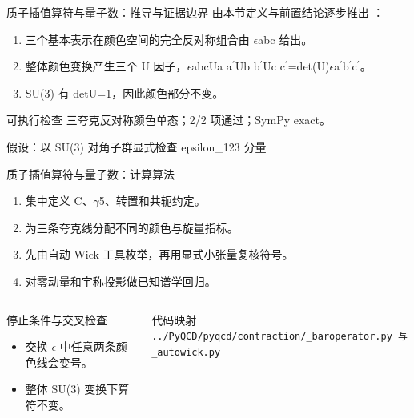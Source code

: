 \begin{frame}[t]{质子插值算符与量子数：推导与证据边界}
\footnotesize
{}\quad 由本节定义与前置结论逐步推出 ：
\begin{enumerate}
\item 三个基本表示在颜色空间的完全反对称组合由 \ensuremath{\epsilon}abc 给出。
\item 整体颜色变换产生三个 U 因子，\ensuremath{\epsilon}abcUa a\ensuremath{^{\prime}}Ub b\ensuremath{^{\prime}}Uc c\ensuremath{^{\prime}}=det(U)\ensuremath{\epsilon}a\ensuremath{^{\prime}}b\ensuremath{^{\prime}}c\ensuremath{^{\prime}}。
\item SU(3) 有 detU=1，因此颜色部分不变。
\end{enumerate}\begin{block}{可执行检查}
\quad 三夸克反对称颜色单态；2/2 项通过；SymPy exact。
\par\scriptsize 假设：以 SU(3) 对角子群显式检查 epsilon\_123 分量
\end{block}
\end{frame}

\begin{frame}[t]{质子插值算符与量子数：计算算法}
\footnotesize
{}\begin{enumerate}
\item 集中定义 C、\ensuremath{\gamma}5、转置和共轭约定。
\item 为三条夸克线分配不同的颜色与旋量指标。
\item 先由自动 Wick 工具枚举，再用显式小张量复核符号。
\item 对零动量和宇称投影做已知谱学回归。
\end{enumerate}\begin{columns}[T,onlytextwidth]
\begin{block}{停止条件与交叉检查}\scriptsize\begin{itemize}
\item[\CheckMark] 交换 \ensuremath{\epsilon} 中任意两条颜色线会变号。
\item[\CheckMark] 整体 SU(3) 变换下算符不变。
\end{itemize}\end{block}
\begin{block}{代码映射}
\scriptsize \texttt{.\allowbreak{}.\allowbreak{}/\allowbreak{}PyQCD/\allowbreak{}pyqcd/\allowbreak{}contraction/\allowbreak{}\_\allowbreak{}baroperator.\allowbreak{}py 与 \_\allowbreak{}autowick.\allowbreak{}py}
\end{block}\end{columns}\end{frame}

